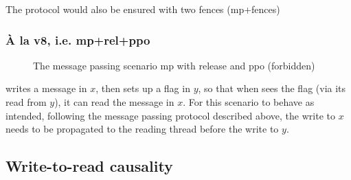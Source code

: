 \documentclass[a4paper]{article}
\begin{document}
The protocol would also be ensured with two fences (\textsf{mp+fences})


\subsubsection{\`A la v8, i.e. \textsf{mp+rel+ppo}}

\begin{figure}[!h]
\vspace*{-2mm}
\begin{center}
\end{center}
\vspace*{-8mm}
\caption{The message passing scenario \textsf{mp} with release and
ppo (forbidden) \label{fig:mp+rel+ppo}}
\end{figure}

 writes a message in $x$, then sets up a flag in $y$, so that when
 sees the flag (via its read from $y$), it can read the message in $x$.
For this scenario to behave as intended, following the message passing protocol
described above, the write to $x$ needs to be propagated to the reading thread
before the write to $y$.


\newpage

\subsection{Write-to-read causality}
\end{document}
